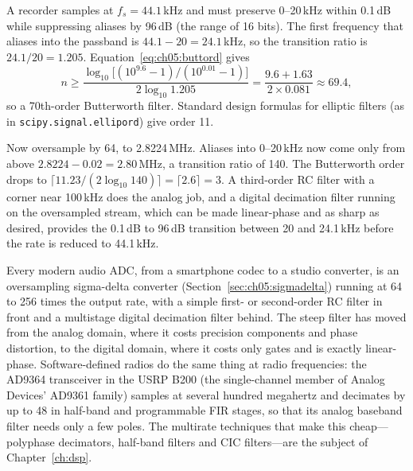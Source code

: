 \begin{worked}
A recorder samples at $f_s=44.1$\,kHz and must preserve 0--20\,kHz within 0.1\,dB while
suppressing aliases by 96\,dB (the range of 16 bits). The first frequency that aliases into
the passband is $44.1-20=24.1$\,kHz, so the transition ratio is $24.1/20=1.205$.
Equation~\eqref{eq:ch05:buttord} gives
\[
n\ge\frac{\log_{10}\big[(10^{9.6}-1)/(10^{0.01}-1)\big]}{2\log_{10}1.205}
=\frac{9.6+1.63}{2\times0.081}\approx69.4,
\]
so a 70th-order Butterworth filter. Standard design formulas for elliptic filters
(as in \texttt{scipy.signal.ellipord}) give order 11.

Now oversample by 64, to 2.8224\,MHz. Aliases into 0--20\,kHz now come only from above
$2.8224-0.02=2.80$\,MHz, a transition ratio of 140. The Butterworth order drops to
$\lceil 11.23/(2\log_{10}140)\rceil=\lceil 2.6\rceil=3$. A third-order RC filter with a
corner near 100\,kHz does the analog job, and a digital decimation filter running on the
oversampled stream, which can be made linear-phase and as sharp as desired, provides the
0.1\,dB to 96\,dB transition between 20 and 24.1\,kHz before the rate is reduced to
44.1\,kHz.
\end{worked}


\begin{inpractice}
Every modern audio ADC, from a smartphone codec to a studio converter, is an oversampling
sigma-delta converter (Section~\ref{sec:ch05:sigmadelta}) running at 64 to 256 times the
output rate, with a simple first- or second-order RC filter in front and a multistage
digital decimation filter behind. The steep filter has moved from the analog domain, where
it costs precision components and phase distortion, to the digital domain, where it costs
only gates and is exactly linear-phase. Software-defined radios do the same thing at radio
frequencies: the AD9364 transceiver in the USRP B200 (the single-channel member of Analog
Devices' AD9361 family) samples at several hundred megahertz and decimates by up to 48 in
half-band and programmable FIR stages, so that its analog baseband filter needs only a few
poles. The multirate techniques that make this cheap---polyphase decimators, half-band filters
and CIC filters---are the subject of Chapter~\ref{ch:dsp}.
\end{inpractice}

